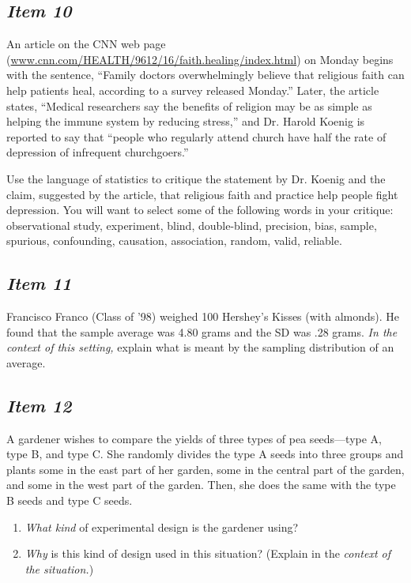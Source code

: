 \documentclass[twoside,openany]{tufte-book}
\begin{document}
\subsection{\textbf{\textit{Item 10}}}
An article on the CNN web page (\url{www.cnn.com/HEALTH/9612/16/faith.healing/index.html}) on Monday begins with the sentence, ``Family doctors overwhelmingly believe that religious faith can help patients heal, according to a survey released Monday.''  Later, the article states, ``Medical researchers say the benefits of religion may be as simple as helping the immune system by reducing stress,'' and Dr. Harold Koenig is reported to say that ``people who regularly attend church have half the rate of depression of infrequent churchgoers.''
  
Use the language of statistics to critique the statement by Dr. Koenig and the claim, suggested by the article, that religious faith and practice help people fight depression. You will want to select some of the following words in your critique: observational study, experiment, blind, double-blind, precision, bias, sample, spurious, confounding, causation, association, random, valid, reliable.

\subsection{\textbf{\textit{Item 11}}}
Francisco Franco (Class of '98) weighed 100 Hershey's Kisses (with almonds).  He found that the sample average was 4.80 grams and the SD was .28 grams. \textit{In the context of this setting,} explain what is meant by the sampling distribution of an average.

\subsection{\textbf{\textit{Item 12}}}
A gardener wishes to compare the yields of three types of pea seeds---type A, type B, and type C.  She randomly divides the type A seeds into three groups and plants some in the east part of her garden, some in the central part of the garden, and some in the west part of the garden.  Then, she does the same with the type B seeds and type C seeds.
\begin{enumerate}[leftmargin=1cm, itemsep=.2em]
\item \textit{What kind} of experimental design is the gardener using?
\item \textit{Why} is this kind of design used in this situation?  (Explain in the \textit{context of the situation.})
\end{enumerate}
\end{document}
